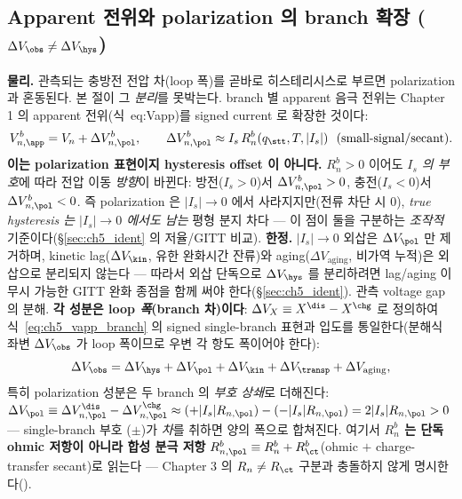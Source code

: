 \subsection{Apparent 전위와 polarization 의 branch 확장 ($\Delta V_\obs\ne\Delta V_\hys$)}\label{sec:ch5_apparent}
\textbf{물리.} 관측되는 충방전 전압 차(loop 폭)를 곧바로 히스테리시스로 부르면 polarization 과 혼동된다. 본
절이 그 \emph{분리}를 못박는다. branch 별 apparent 음극 전위는 Chapter 1 의 apparent 전위(식~eq:Vapp)를 signed
current 로 확장한 것이다:
\begin{equation}
V_{n,\app}^b=V_n+\Delta V_{n,\pol}^b,\qquad
\Delta V_{n,\pol}^b\approx I_s\,R_n^b(q_\stt,T,|I_s|)\ \ \text{(small-signal/secant)}.
\label{eq:ch5_vapp_branch}
\end{equation}
\textbf{이는 polarization 표현이지 hysteresis offset 이 아니다.} $R_n^b>0$ 이어도 \emph{$I_s$ 의 부호}에 따라
전압 이동 \emph{방향}이 바뀐다: 방전($I_s>0$)서 $\Delta V_{n,\pol}^b>0$, 충전($I_s<0$)서 $\Delta V_{n,\pol}^b<0$.
즉 polarization 은 $|I_s|\to0$ 에서 사라지지만(전류 차단 시 0), \emph{true hysteresis 는 $|I_s|\to0$ 에서도
남는} 평형 분지 차다 — 이 점이 둘을 구분하는 \emph{조작적} 기준이다(\S\ref{sec:ch5_ident} 의 저율/GITT 비교).
\textbf{한정.} $|I_s|\to0$ 외삽은 $\Delta V_\pol$ 만 제거하며, kinetic lag($\Delta V_\kin$, 유한 완화시간 잔류)와
aging($\Delta V_{\mathrm{aging}}$, 비가역 누적)은 외삽으로 분리되지 않는다 — 따라서 외삽 단독으로 $\Delta V_\hys$
를 분리하려면 lag/aging 이 무시 가능한 GITT 완화 종점을 함께 써야 한다(\S\ref{sec:ch5_ident}).
관측 voltage gap 의 분해. \textbf{각 성분은 loop \emph{폭}(branch 차)이다}: $\Delta V_X\equiv X^\dis-X^\chg$ 로
정의하여 식~\eqref{eq:ch5_vapp_branch} 의 signed single-branch 표현과 입도를 통일한다(분해식 좌변 $\Delta V_\obs$
가 loop 폭이므로 우변 각 항도 폭이어야 한다):
\begin{equation}
\Delta V_\obs=\Delta V_\hys+\Delta V_\pol+\Delta V_\kin+\Delta V_\transp+\Delta V_{\mathrm{aging}},
\label{eq:ch5_gap_decomp}
\end{equation}
특히 polarization 성분은 두 branch 의 \emph{부호 상쇄}로 더해진다: $\Delta V_\pol\equiv\Delta V_{n,\pol}^\dis
-\Delta V_{n,\pol}^\chg\approx(+|I_s|R_{n,\pol})-(-|I_s|R_{n,\pol})=2|I_s|R_{n,\pol}>0$ — single-branch 부호
($\pm$)가 \emph{차}를 취하면 양의 폭으로 합쳐진다. 여기서 \textbf{$R_n^b$ 는 단독 ohmic 저항이 아니라 합성 분극
저항} $R_{n,\pol}^b\equiv R_n^b+R_\ct^b$(ohmic $+$ charge-transfer secant)로 읽는다 — Chapter 3 의 $R_n\ne R_\ct$
구분과 충돌하지 않게 명시한다().
